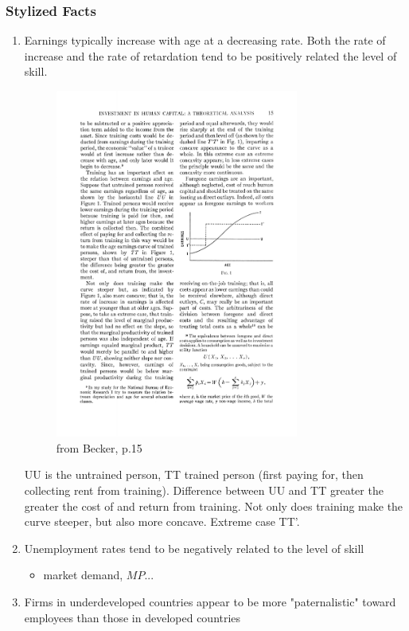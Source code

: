\documentclass[12pt,a4paper]{article}
\begin{document}
  \subsubsection{Stylized Facts} %
  \begin{enumerate}
    \item Earnings typically increase with age at a decreasing rate. Both the rate of increase and the rate of retardation tend to be positively related the level of skill.\\
      \begin{figure}[ht]
        \centering
        \includegraphics[width=8cm]{fig1.pdf}
        \caption{from Becker, p.15}
        \label{fig1}
      \end{figure}
      UU is the untrained person, TT trained person (first paying for, then collecting rent from training). Difference between UU and TT greater the greater the cost of and return from training. Not only does training make the curve steeper, but also more concave. Extreme case TT'.
    \item Unemployment rates tend to be negatively related to the level of skill
      \begin{itemize}
        \item market demand, $MP$...
      \end{itemize}
    \item Firms in underdeveloped countries appear to be more
      "paternalistic" toward employees than those in developed countries
      \begin{itemize}

\end{itemize}
\end{enumerate}
\end{document}
